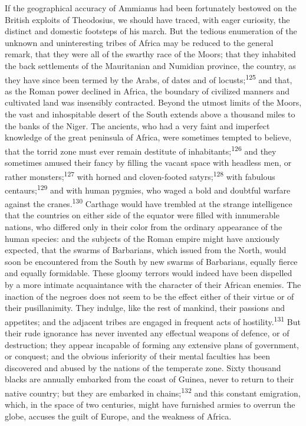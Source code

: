 If the geographical accuracy of Ammianus had been fortunately
bestowed on the British exploits of Theodosius, we should have
traced, with eager curiosity, the distinct and domestic footsteps
of his march. But the tedious enumeration of the unknown and
uninteresting tribes of Africa may be reduced to the general
remark, that they were all of the swarthy race of the Moors; that
they inhabited the back settlements of the Mauritanian and
Numidian province, the country, as they have since been termed by
the Arabs, of dates and of locusts;\textsuperscript{125} and that, as the Roman
power declined in Africa, the boundary of civilized manners and
cultivated land was insensibly contracted. Beyond the utmost
limits of the Moors, the vast and inhospitable desert of the
South extends above a thousand miles to the banks of the Niger.
The ancients, who had a very faint and imperfect knowledge of the
great peninsula of Africa, were sometimes tempted to believe,
that the torrid zone must ever remain destitute of inhabitants;\textsuperscript{126}
and they sometimes amused their fancy by filling the vacant
space with headless men, or rather monsters;\textsuperscript{127} with horned and
cloven-footed satyrs;\textsuperscript{128} with fabulous centaurs;\textsuperscript{129} and with
human pygmies, who waged a bold and doubtful warfare against the
cranes.\textsuperscript{130} Carthage would have trembled at the strange
intelligence that the countries on either side of the equator
were filled with innumerable nations, who differed only in their
color from the ordinary appearance of the human species: and the
subjects of the Roman empire might have anxiously expected, that
the swarms of Barbarians, which issued from the North, would soon
be encountered from the South by new swarms of Barbarians,
equally fierce and equally formidable. These gloomy terrors would
indeed have been dispelled by a more intimate acquaintance with
the character of their African enemies. The inaction of the
negroes does not seem to be the effect either of their virtue or
of their pusillanimity. They indulge, like the rest of mankind,
their passions and appetites; and the adjacent tribes are engaged
in frequent acts of hostility.\textsuperscript{131} But their rude ignorance has
never invented any effectual weapons of defence, or of
destruction; they appear incapable of forming any extensive plans
of government, or conquest; and the obvious inferiority of their
mental faculties has been discovered and abused by the nations of
the temperate zone. Sixty thousand blacks are annually embarked
from the coast of Guinea, never to return to their native
country; but they are embarked in chains;\textsuperscript{132} and this constant
emigration, which, in the space of two centuries, might have
furnished armies to overrun the globe, accuses the guilt of
Europe, and the weakness of Africa.

